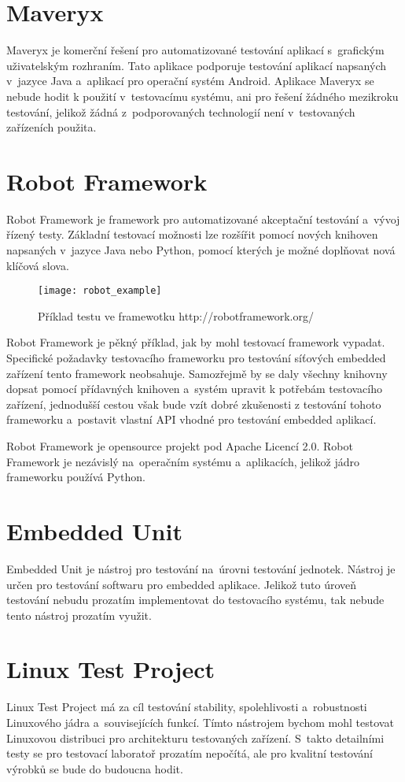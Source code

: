 \section{Maveryx}
Maveryx je komerční řešení pro automatizované testování aplikací s~grafickým uživatelským rozhraním. Tato aplikace podporuje testování aplikací napsaných v~jazyce Java a~aplikací pro operační systém Android. Aplikace Maveryx se nebude hodit k použití v~testovacímu systému, ani pro řešení žádného mezikroku testování, jelikož žádná z~podporovaných technologií není v~testovaných zařízeních použita.

\section{Robot Framework}
Robot Framework je framework pro automatizované akceptační testování a~vývoj řízený testy. Základní testovací možnosti lze rozšířit pomocí nových knihoven napsaných v~jazyce Java nebo Python, pomocí kterých je možné doplňovat nová klíčová slova.

\begin{figure}[h]
  \centering
  \texttt{[image: robot\_example]}
  \caption{Příklad testu ve framewotku http://robotframework.org/}
  \label{fig:robot_example}
\end{figure}

Robot Framework je pěkný příklad, jak by mohl testovací framework vypadat. Specifické požadavky testovacího frameworku pro testování síťových embedded zařízení tento framework neobsahuje. Samozřejmě by se daly všechny knihovny dopsat pomocí přídavných knihoven a~systém upravit k potřebám testovacího zařízení, jednodušší cestou však bude vzít dobré zkušenosti z testování tohoto frameworku a~postavit vlastní API vhodné pro testování embedded aplikací.

Robot Framework je opensource projekt pod Apache Licencí 2.0. Robot Framework je nezávislý na~operačním systému a~aplikacích, jelikož jádro frameworku používá Python.

\section{Embedded Unit}
Embedded Unit je nástroj pro testování na~úrovni testování jednotek. Nástroj je určen pro testování softwaru pro embedded aplikace. Jelikož tuto úroveň testování nebudu prozatím implementovat do testovacího systému, tak nebude tento nástroj prozatím využit.

\section{Linux Test Project}
Linux Test Project má za cíl testování stability, spolehlivosti a~robustnosti Linuxového jádra a~souvisejících funkcí. Tímto nástrojem bychom mohl testovat Linuxovou distribuci pro architekturu testovaných zařízení. S~takto detailními testy se pro testovací laboratoř prozatím nepočítá, ale pro kvalitní testování výrobků se bude do budoucna hodit.

